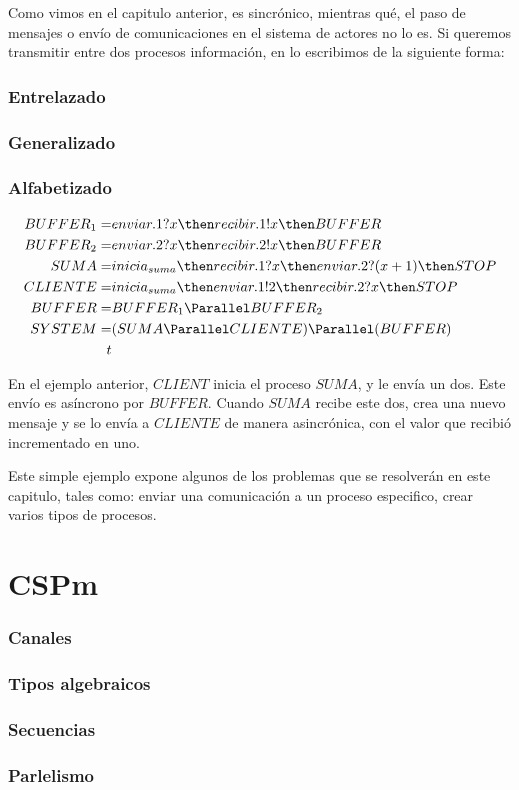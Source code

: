 Como vimos en el capitulo anterior, \CSP es sincrónico, mientras qué, el paso de mensajes o envío de comunicaciones en el sistema de actores no lo es. Si queremos transmitir entre dos procesos información, en \CSP lo escribimos de la siguiente forma:

\subsubsection*{Entrelazado}

\subsubsection*{Generalizado}

\subsubsection*{Alfabetizado}

\begin{align*}
BUFFER_1 =& enviar.1?x \then recibir.1!x \then BUFFER\\
BUFFER_2 =& enviar.2?x \then recibir.2!x \then BUFFER\\
SUMA =& inicia_{suma} \then recibir.1?x \then enviar.2?(x + 1) \then STOP \\
CLIENTE =& inicia_{suma}\then enviar.1!2 \then recibir.2?x \then STOP \\
BUFFER =& BUFFER_1 \Parallel BUFFER_2 \\
SYSTEM =& (SUMA \Parallel CLIENTE) \Parallel (BUFFER)\\t
\end{align*}

En el ejemplo anterior, $CLIENT$ inicia el proceso $SUMA$, y le envía un dos. Este envío es asíncrono por $BUFFER$. Cuando $SUMA$ recibe este dos, crea una nuevo mensaje y se lo envía a $CLIENTE$ de manera asincrónica, con el valor que recibió incrementado en uno.

Este simple ejemplo expone algunos de los problemas que se resolverán en este capitulo, tales como: enviar una comunicación a un proceso especifico, crear varios tipos de procesos.

\section{CSPm}


\subsubsection{Canales}

\subsubsection{Tipos algebraicos}

\subsubsection{Secuencias}

\subsubsection{Parlelismo}



